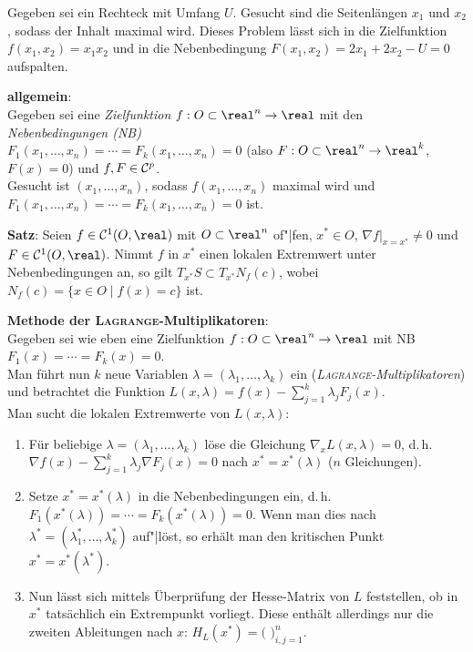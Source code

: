Gegeben sei ein Rechteck mit Umfang $U$.
Gesucht sind die Seitenlängen $x_1$ und $x_2$, sodass der Inhalt maximal wird.
Dieses Problem lässt sich in die Zielfunktion $f(x_1, x_2) = x_1 x_2$ und
in die Nebenbedingung $F(x_1, x_2) = 2x_1 + 2x_2 - U = 0$ aufspalten.

\linie

\textbf{allgemein}: \\
Gegeben sei eine \emph{Zielfunktion} $f: O \subset \real^n \rightarrow \real$
mit den \emph{Nebenbedingungen (NB)} \\
$F_1(x_1, \dotsc, x_n) = \dotsb = F_k(x_1, \dotsc, x_n) = 0$
(also $F: O \subset \real^n \rightarrow \real^k$, $F(x) = 0$)
und $f, F \in \mathcal{C}^p$. \\
Gesucht ist $(x_1, \dotsc, x_n)$, sodass $f(x_1, \dotsc, x_n)$ maximal wird
und \\
$F_1(x_1, \dotsc, x_n) = \dotsb = F_k(x_1, \dotsc, x_n) = 0$ ist.

\textbf{Satz}:
Seien $f \in \C^1(O, \real)$ mit $O \subset \real^n$ of"|fen,
$x^\ast \in O$, $\nabla f|_{x=x^\ast} \not= 0$ und $F \in \C^1(O, \real)$.
Nimmt $f$ in $x^\ast$ einen lokalen Extremwert unter Nebenbedingungen an,
so gilt $T_{x^\ast} S \subset T_{x^\ast} N_f(c)$, wobei
$N_f(c) = \{x \in O \;|\; f(x) = c\}$ ist.

\linie

\textbf{Methode der \textsc{Lagrange}-Multiplikatoren}: \\
Gegeben sei wie eben eine Zielfunktion $f: O \subset \real^n \rightarrow \real$
mit NB $F_1(x) = \dotsb = F_k(x) = 0$. \\
Man führt nun $k$ neue Variablen $\lambda = (\lambda_1, \dotsc, \lambda_k)$ ein
(\emph{\textsc{Lagrange}-Multiplikatoren}) und betrachtet die Funktion
$L(x, \lambda) = f(x) - \sum_{j=1}^k \lambda_j F_j(x)$. \\
Man sucht die lokalen Extremwerte von $L(x, \lambda)$:
\begin{enumerate}
    \item
    Für beliebige $\lambda = (\lambda_1, \dotsc, \lambda_k)$
    löse die Gleichung $\nabla_x L(x, \lambda) = 0$, d.\,h. \\
    $\nabla f(x) - \sum_{j=1}^k \lambda_j \nabla F_j(x) = 0$
    nach $x^\ast = x^\ast(\lambda)$
    ($n$ Gleichungen).

    \item
    Setze $x^\ast = x^\ast(\lambda)$ in die Nebenbedingungen ein, d.\,h.
    $F_1(x^\ast(\lambda)) = \dotsb = F_k(x^\ast(\lambda)) = 0$.
    Wenn man dies nach
    $\lambda^\ast = (\lambda_1^\ast, \dotsc, \lambda_k^\ast)$ auf"|löst, so
    erhält man den kritischen Punkt \\
    $x^\ast = x^\ast(\lambda^\ast)$.

    \item
    Nun lässt sich mittels Überprüfung der Hesse-Matrix von $L$ feststellen,
    ob in $x^\ast$ tatsächlich ein Extrempunkt vorliegt.
    Diese enthält allerdings nur die zweiten Ableitungen nach $x$:
    $H_L(x^\ast) = \Big($%
    $\Big)_{i,j=1}^n$.
\end{enumerate}

\pagebreak
